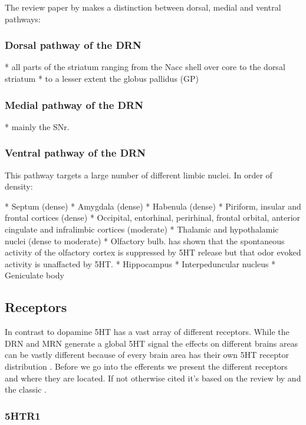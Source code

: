 \documentclass[12pt,a4paper]{article}
\begin{document}
The review paper by \citep{Michelsen2007} makes a distinction between dorsal, medial and ventral pathways:

\subsubsection{Dorsal pathway of the DRN}

  * all parts of the striatum ranging from the Nacc shell over core to the dorsal striatum
  * to a lesser extent the globus pallidus (GP)

\subsubsection{Medial pathway of the DRN}

  * mainly the SNr.

\subsubsection{Ventral pathway of the DRN}

This pathway targets a large number of different limbic nuclei. In order of density:

  * Septum (dense)
  * Amygdala (dense)
  * Habenula (dense)
  * Piriform, insular and frontal cortices (dense)
  * Occipital, entorhinal, perirhinal, frontal orbital, anterior cingulate and infralimbic cortices (moderate)
  * Thalamic and hypothalamic nuclei (dense to moderate)
  * Olfactory bulb. \citep{Lottem2016} has shown that the spontaneous activity of the olfactory cortex is suppressed by 5HT release but that odor evoked activity is unaffacted by 5HT.
  * Hippocampus
  * Interpeduncular nucleus
  * Geniculate body


\subsection{Receptors}

In contrast to dopamine 5HT has a vast array of different receptors. While the DRN and MRN generate a global 5HT signal the effects on different brains areas can be vastly different because of every brain area has their own 5HT receptor distribution \citep{Palacios1990} \citep{Carhart-Harris2017}. Before we go into the efferents we present the different receptors and where they are located. If not otherwise cited it's based on the review by \citep{Mengod2010} and the classic \citep{Palacios1990}.

\subsubsection{5HTR1}
\end{document}
